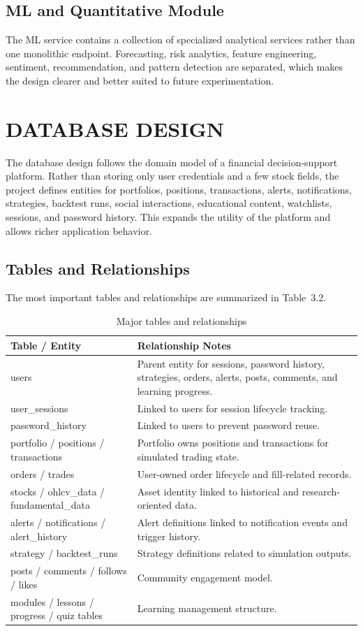 \documentclass[12pt,a4paper]{report}
\begin{document}
\subsection{ML and Quantitative Module}
The ML service contains a collection of specialized analytical services rather than one monolithic endpoint. Forecasting, risk analytics, feature engineering, sentiment, recommendation, and pattern detection are separated, which makes the design clearer and better suited to future experimentation.

\section{DATABASE DESIGN}
The database design follows the domain model of a financial decision-support platform. Rather than storing only user credentials and a few stock fields, the project defines entities for portfolios, positions, transactions, alerts, notifications, strategies, backtest runs, social interactions, educational content, watchlists, sessions, and password history. This expands the utility of the platform and allows richer application behavior.

\subsection{Tables and Relationships}
The most important tables and relationships are summarized in Table~3.2.

\begin{table}[H]
\centering
\caption{Major tables and relationships}
\begin{tabularx}{\textwidth}{>{\raggedright\arraybackslash}p{1.9in} X}
\toprule
\textbf{Table / Entity} & \textbf{Relationship Notes} \\
\midrule
users & Parent entity for sessions, password history, strategies, orders, alerts, posts, comments, and learning progress. \\
user\_sessions & Linked to users for session lifecycle tracking. \\
password\_history & Linked to users to prevent password reuse. \\
portfolio / positions / transactions & Portfolio owns positions and transactions for simulated trading state. \\
orders / trades & User-owned order lifecycle and fill-related records. \\
stocks / ohlcv\_data / fundamental\_data & Asset identity linked to historical and research-oriented data. \\
alerts / notifications / alert\_history & Alert definitions linked to notification events and trigger history. \\
strategy / backtest\_runs & Strategy definitions related to simulation outputs. \\
posts / comments / follows / likes & Community engagement model. \\
modules / lessons / progress / quiz tables & Learning management structure. \\
\bottomrule
\end{tabularx}
\end{table}
\end{document}
